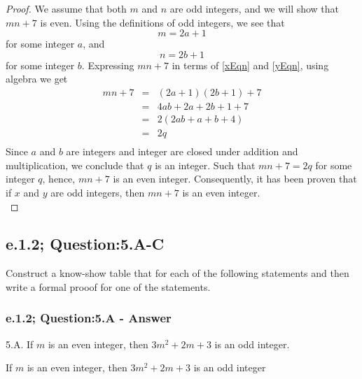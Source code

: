 \begin{proof}
We assume that both $m$ and $n$ are odd integers, and we will show that $mn + 7$ is even. Using the definitions of odd integers, we see that
\begin{equation}
\label{xEqn}
m = 2a + 1
\end{equation}
for some integer $a$, and
\begin{equation}
\label{yEqn}
n = 2b + 1
\end{equation}
for some integer $b$. Expressing $mn + 7$ in terms of \ref{xEqn} and \ref{yEqn}, using algebra we get
\begin{eqnarray*}
mn + 7 & = & (2a + 1)(2b + 1) + 7  \nonumber \\
& = & 4ab + 2a + 2b + 1 + 7 \nonumber \\
& = & 2(2ab + a + b + 4) \nonumber \\
& = & 2q \nonumber \\
\end{eqnarray*}
Since $a$ and $b$ are integers and integer are closed under addition and multiplication, we conclude that $q$ is an integer. Such that $mn + 7 = 2q$ for some integer $q$, hence, $mn + 7$ is an even integer. Consequently, it has been proven that if $x$ and $y$ are odd integers, then $mn + 7$ is an even integer. \\
\end{proof}




\subsection{e.1.2; Question:5.A-C}
Construct a know-show table that for each of the following statements and then write a formal prooof for one of the statements. \\

\subsubsection*{e.1.2; Question:5.A - Answer}
5.A. If $m$ is an even integer, then $3m^2 + 2m + 3$ is an odd integer. \\ 
\begin{tcolorbox}
\begin{theorem}
If $m$ is an even integer, then $3m^2 + 2m + 3$ is an odd integer
\end{theorem}
\end{tcolorbox}

